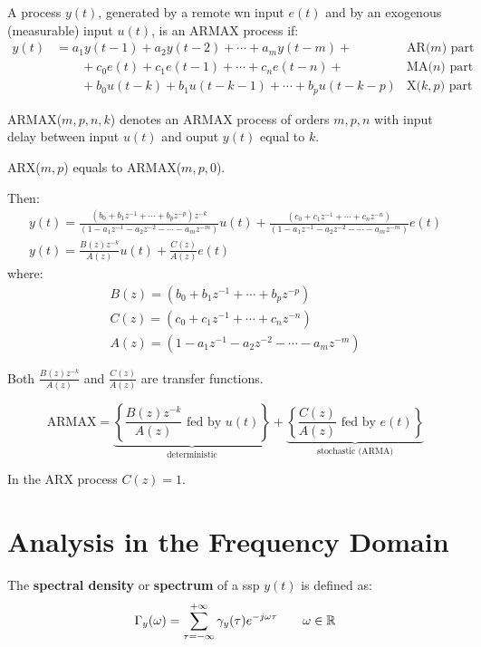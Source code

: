 A process $y(t)$, generated by a remote \gls{wn} input $e(t)$ and by an exogenous (measurable) input $u(t)$, is an ARMAX process if:
\begin{align*}
	y(t)&=a_{1} y(t-1)+a_{2} y(t-2)+\cdots+a_{m} y(t-m)+ &\text{AR($m$) part}\\
	&\qquad+c_{0} e(t)+c_{1} e(t-1)+\cdots+c_{n} e(t-n)+ &\text{MA($n$) part} \\
	&\qquad+b_{0} u(t-k)+b_{1} u(t-k-1)+\cdots+b_{p} u(t-k-p)  &\text{X($k,p$) part}
\end{align*}

ARMAX($m,p,n,k$) denotes an ARMAX process of orders $m,p,n$ with input delay between input $u(t)$ and ouput $y(t)$ equal to $k$.

ARX($m,p$) equals to ARMAX($m,p,0$).

Then:
\begin{gather*}
	y(t) = \frac{\left(b_{0}+b_{1} z^{-1}+\cdots+b_{p} z^{-p}\right) z^{-k}}{\left(1-a_{1} z^{-1}-a_{2} z^{-2}-\cdots-a_{m} z^{-m}\right)} u(t)+\frac{\left(c_{0}+c_{1} z^{-1}+\cdots+c_{n} z^{-n}\right)}{\left(1-a_{1} z^{-1}-a_{2} z^{-2}-\cdots-a_{m} z^{-m}\right)} e(t)\\
	\boxed{y(t)=\frac{B(z) z^{-k}}{A(z)} u(t)+\frac{C(z)}{A(z)} e(t)}
\end{gather*}
where:
\begin{gather*}
	\boxed{B(z) = \left(b_{0}+b_{1} z^{-1}+\cdots+b_{p} z^{-p}\right)}\\
	\boxed{C(z) = \left(c_{0}+c_{1} z^{-1}+\cdots+c_{n} z^{-n}\right)}\\
	\boxed{A(z) = \left(1-a_{1} z^{-1}-a_{2} z^{-2}-\cdots-a_{m} z^{-m}\right)}
\end{gather*}

Both $\frac{B(z) z^{-k}}{A(z)}$ and $\frac{C(z)}{A(z)}$ are transfer functions.

\[
	\text{ARMAX}=\underbrace{\left\{ \frac{B(z) z^{-k}}{A(z)} \text{ fed by } u(t) \right\}}_{\text{deterministic}} + \underbrace{\left\{ \frac{C(z)}{A(z)} \text{ fed by } e(t) \right\}  }_{\text{stochastic (ARMA)}}
\]

In the ARX process $C(z)=1$.

\chapter{Analysis in the Frequency Domain}
\begin{definition}
	The \textbf{spectral density} or \textbf{spectrum} of a \gls{ssp} $y(t)$ is defined as:
	\[
		\Gamma_{y}(\omega)=\sum_{\tau=-\infty}^{+\infty} \gamma_{y}(\tau) e^{-j \omega \tau} \qquad \omega \in \mathbb{R}
	\]
\end{definition}

